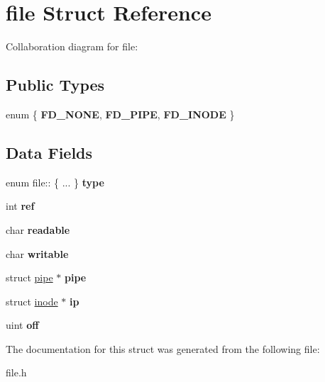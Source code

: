 \hypertarget{structfile}{}\section{file Struct Reference}
\label{structfile}


Collaboration diagram for file\+:
\subsection*{Public Types}
\begin{DoxyCompactItemize}
\item 
\mbox{\label{structfile_adcfd105f46b2868a7694fa7f38de263f}} 
enum \{ {\bfseries F\+D\+\_\+\+N\+O\+NE}, 
{\bfseries F\+D\+\_\+\+P\+I\+PE}, 
{\bfseries F\+D\+\_\+\+I\+N\+O\+DE}
 \}
\end{DoxyCompactItemize}
\subsection*{Data Fields}
\begin{DoxyCompactItemize}
\item 
\mbox{\label{structfile_aeb945bc9619708cd2d5f7ae28faf922a}} 
enum file\+:: \{ ... \}  {\bfseries type}
\item 
\mbox{\label{structfile_a41c818f828adea488058bca63e4df23f}} 
int {\bfseries ref}
\item 
\mbox{\label{structfile_a0c5c8eced8bc562dbbecc8d450a6b646}} 
char {\bfseries readable}
\item 
\mbox{\label{structfile_a6e1b641ea1551ac4316a0c11a683df45}} 
char {\bfseries writable}
\item 
\mbox{\label{structfile_a19d83a8d6cb47902fe8c762d2798c198}} 
struct \mbox{\hyperlink{structpipe}{pipe}} $\ast$ {\bfseries pipe}
\item 
\mbox{\label{structfile_a4fd095f927715574dc2a4f243690e508}} 
struct \mbox{\hyperlink{structinode}{inode}} $\ast$ {\bfseries ip}
\item 
\mbox{\label{structfile_a94a911be6cc1b1326728392d8b40150d}} 
uint {\bfseries off}
\end{DoxyCompactItemize}


The documentation for this struct was generated from the following file\+:\begin{DoxyCompactItemize}
\item 
file.\+h\end{DoxyCompactItemize}
